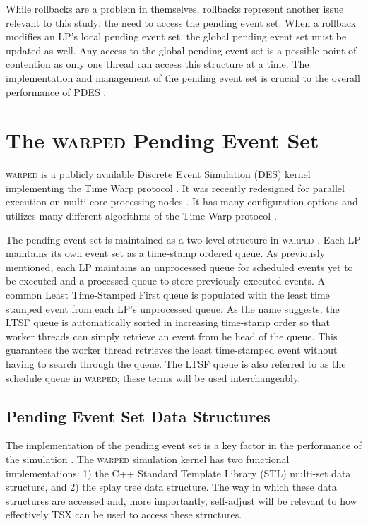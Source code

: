 \documentclass[11pt]{book}
\begin{document}
While rollbacks are a problem in themselves, rollbacks represent another issue relevant to
this study; the need to access the pending event set.  When a rollback modifies an LP's
local pending event set, the global pending event set must be updated as well.  Any access
to the global pending event set is a possible point of contention as only one thread can
access this structure at a time.  The implementation and management of the pending event
set is crucial to the overall performance of PDES \cite{twpes}.

\section{The \textsc{warped} Pending Event Set}

\textsc{warped} is a publicly available Discrete Event Simulation (DES) kernel
implementing the Time Warp protocol \cite{martin,fujimoto}.  It was recently redesigned
for parallel execution on multi-core processing nodes \cite{muthalagu}.  It has many
configuration options and utilizes many different algorithms of the Time Warp protocol
\cite{fujimoto}.


The pending event set is maintained as a two-level structure in \textsc{warped}
\cite{dickman}.  Each LP maintains its own event set as a time-stamp ordered
queue.  As previously mentioned, each LP maintains an unprocessed queue for
scheduled events yet to be executed and a processed queue to store previously
executed events.  A common Least Time-Stamped First queue is populated with the
least time stamped event from each LP's unprocessed queue.  As the name
suggests, the LTSF queue is automatically sorted in increasing time-stamp order
so that worker threads can simply retrieve an event from he head of the queue.
This guarantees the worker thread retrieves the least time-stamped event without
having to search through the queue. The LTSF queue is also referred to as the
schedule queue in \textsc{warped}; these terms will be used interchangeably.


\subsection{Pending Event Set Data Structures}

The implementation of the pending event set is a key factor in the performance
of the simulation \cite{twpes}.  The \textsc{warped} simulation kernel has two
functional implementations: 1) the C++ Standard Template Library (STL) multi-set
data structure, and 2) the splay tree data structure.  The way in which these
data structures are accessed and, more importantly, self-adjust will be relevant
to how effectively TSX can be used to access these structures.
\end{document}

